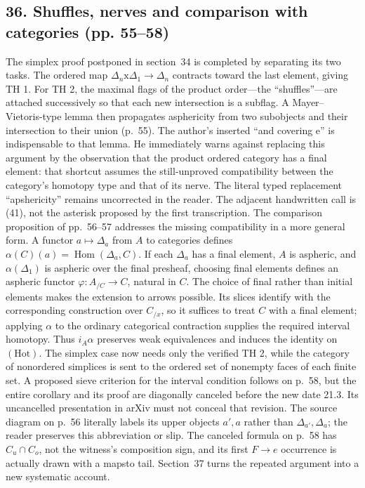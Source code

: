 \documentclass[10pt,oneside]{book}
\begin{document}
\subsection*{36. Shuffles, nerves and comparison with categories (pp. 55--58)}
The simplex proof postponed in section~34 is completed by separating its two tasks. The ordered map $\Delta_n\mathrm{x}\Delta_1\to\Delta_n$ contracts toward the last element, giving TH 1. For TH 2, the maximal flags of the product order---the ``shuffles''---are attached successively so that each new intersection is a subflag. A Mayer--Vietoris-type lemma then propagates asphericity from two subobjects and their intersection to their union (p.~55). The author's inserted ``and covering e'' is indispensable to that lemma. He immediately warns against replacing this argument by the observation that the product ordered category has a final element: that shortcut assumes the still-unproved compatibility between the category's homotopy type and that of its nerve. The literal typed replacement ``apshericity'' remains uncorrected in the reader. The adjacent handwritten call is (41), not the asterisk proposed by the first transcription. The comparison proposition of pp.~56--57 addresses the missing compatibility in a more general form. A functor $a\mapsto\Delta_a$ from $A$ to categories defines $\alpha(C)(a)=\operatorname{Hom}(\Delta_a,C)$. If each $\Delta_a$ has a final element, $A$ is aspheric, and $\alpha(\Delta_1)$ is aspheric over the final presheaf, choosing final elements defines an aspheric functor $\varphi:A_{/C}\to C$, natural in $C$. The choice of final rather than initial elements makes the extension to arrows possible. Its slices identify with the corresponding construction over $C_{/x}$, so it suffices to treat $C$ with a final element; applying $\alpha$ to the ordinary categorical contraction supplies the required interval homotopy. Thus $i_A\alpha$ preserves weak equivalences and induces the identity on $(\mathrm{Hot})$. The simplex case now needs only the verified TH 2, while the category of nonordered simplices is sent to the ordered set of nonempty faces of each finite set. A proposed sieve criterion for the interval condition follows on p.~58, but the entire corollary and its proof are diagonally canceled before the new date 21.3. Its uncancelled presentation in arXiv must not conceal that revision. The source diagram on p.~56 literally labels its upper objects $a',a$ rather than $\Delta_{a'},\Delta_a$; the reader preserves this abbreviation or slip. The canceled formula on p.~58 has $C_u\cap C_o$, not the witness's composition sign, and its first $F\to e$ occurrence is actually drawn with a mapsto tail. Section~37 turns the repeated argument into a new systematic account.
\end{document}
